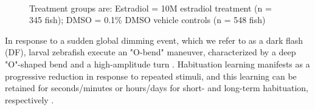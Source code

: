 \documentclass[9pt,lineno]{RandlettLab_elife}
\begin{document}
\begin{figure}
\begin{fullwidth}
\begin{center}
{\\ Treatment groups are: Estradiol = 10\textmu M estradiol treatment (n = 345 fish); DMSO = 0.1\% DMSO vehicle controls (n = 548 fish)
}

\label{fig:1}

\end{center}
\end{fullwidth}
\end{figure}


In response to a sudden global dimming event, which we refer to as a dark flash (DF), larval zebrafish execute an "O-bend" maneuver, characterized by a deep "O"-shaped bend and a high-amplitude turn \citep{Burgess2007}. 
Habituation learning manifests as a progressive reduction in response to repeated stimuli, and this learning can be retained for seconds/minutes or hours/days for short- and long-term habituation, respectively \citep{Rankin2009-no}. 
\end{document}
